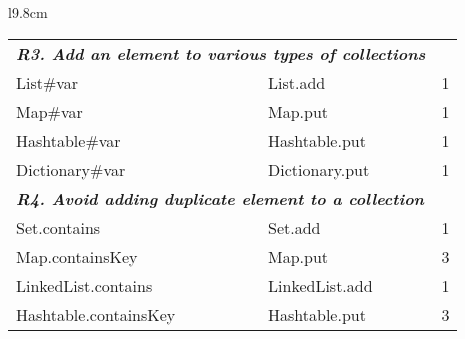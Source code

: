 \begin{wraptable}{l}{9.8cm}
\begin{tabular}{lll}
    \multicolumn{2}{l}{{\bf {\em R3. Add an element to various types of collections}}} & \\
    List\#var & List.add &  1\\
    Map\#var & Map.put &  1\\
    Hashtable\#var & Hashtable.put &  1\\
    Dictionary\#var & Dictionary.put & 1 \\
    \midrule
     \multicolumn{2}{l}{{\bf {\em R4. Avoid adding duplicate element to a collection}}} & \\
     Set.contains & Set.add &  1\\
     Map.containsKey & Map.put &  3\\
     LinkedList.contains & LinkedList.add &  1\\
     Hashtable.containsKey & Hashtable.put & 3\\
     \bottomrule
    \end{tabular}%
  \label{offsetJava}%
\end{wraptable}%








